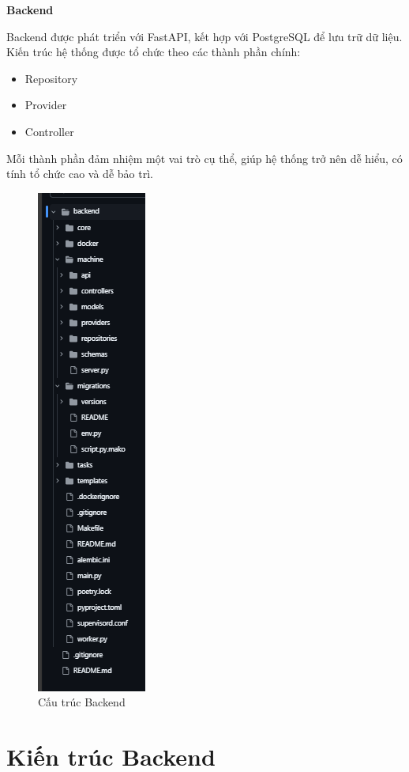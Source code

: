 \textbf{Backend}

Backend được phát triển với FastAPI, kết hợp với PostgreSQL để lưu trữ dữ liệu. Kiến trúc hệ thống được tổ chức theo các thành phần chính:

\begin{itemize}
    \item Repository
    \item Provider
    \item Controller
\end{itemize}

Mỗi thành phần đảm nhiệm một vai trò cụ thể, giúp hệ thống trở nên dễ hiểu, có tính tổ chức cao và dễ bảo trì.

\begin{figure}[H]
    \centering
    \includegraphics[scale=0.5]{Images/Implement/backendStructure.png}
    \caption{Cấu trúc Backend}
\end{figure}

\section{Kiến trúc Backend}

